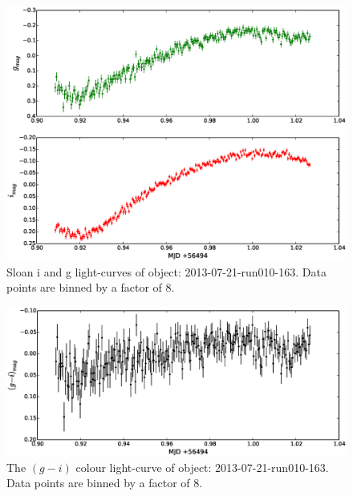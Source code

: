 \begin{figure}
  \center
  \includegraphics[width=120mm]{images/2013-07-21-run010-163_lightcurve-bin8.eps}
  \caption{Sloan i and g light-curves of object: 2013-07-21-run010-163. Data points are binned by a factor of 8.}
  \label{fig:2013-07-21-run010-163}
\end{figure}

\begin{figure}
  \center
  \includegraphics[width=120mm]{images/2013-07-21-run010-163_colourcurve-bin8.eps}
  \caption{The $(g - i)$ colour light-curve of object: 2013-07-21-run010-163. Data points are binned by a factor of 8.}
  \label{fig:2013-07-21-run010-163-colour}
\end{figure}



